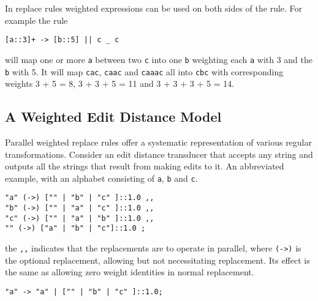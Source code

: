 \documentclass{llncs}
\begin{document}
In replace rules weighted expressions can be used on both sides of the rule.
For example the rule

\begin{center}
\begin{framed}
\begin{verbatim}
[a::3]+ -> [b::5] || c _ c
\end{verbatim}
\end{framed}
\end{center}

\noindent will map one or more {\tt a} between two {\tt c} into one {\tt b} weighting each {\tt a} with 3
and the {\tt b} with 5. It will map {\tt cac}, {\tt caac} and {\tt caaac} all into {\tt cbc} with
corresponding weights 3 + 5 = 8, 3 + 3 + 5 = 11 and 3 + 3 + 3 + 5 = 14.

\subsection{A Weighted Edit Distance Model}

Parallel weighted replace rules offer a systematic representation of various
regular transformations. Consider an edit distance transducer that accepts
any string and outputs all the strings that result from making edits
to it. An abbreviated example, with an alphabet consisting of {\tt a}, {\tt b} and {\tt c}.

\begin{center}
\begin{framed}
\begin{verbatim}
"a" (->) ["" | "b" | "c" ]::1.0 ,,
"b" (->) ["" | "a" | "c" ]::1.0 ,,
"c" (->) ["" | "a" | "b" ]::1.0 ,,
"" (->) ["a" | "b" | "c"]::1.0 ;
\end{verbatim}
\end{framed}
\end{center}

\noindent the \verb+,,+ indicates that the replacements are to operate
in parallel, where \verb+(->)+ is the optional replacement, allowing but not
necessitating replacement. Its effect is the same as allowing zero weight identities
in normal replacement.

\begin{center}
\begin{framed}
\begin{verbatim}
"a" -> "a" | ["" | "b" | "c" ]::1.0;
\end{verbatim}
\end{framed}
\end{center}
\end{document}
